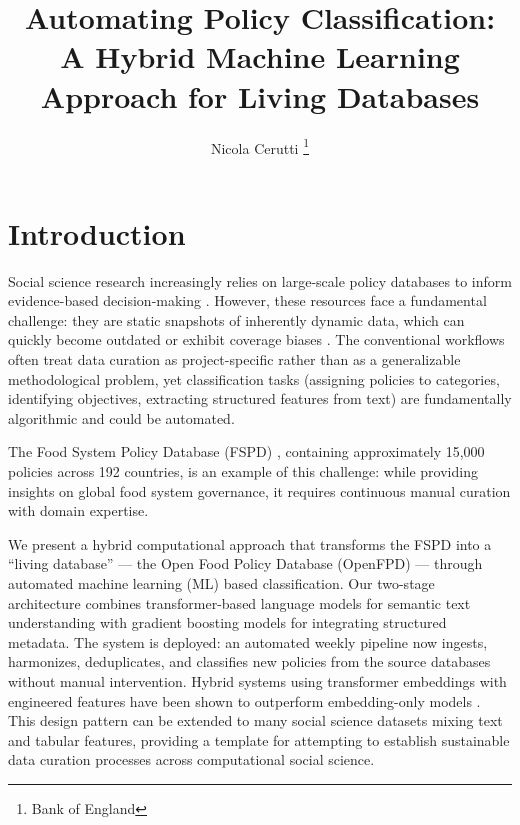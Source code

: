 \documentclass[a4paper,12pt]{article}
\title{Automating Policy Classification: A Hybrid Machine Learning Approach for Living Databases}
\date{}
\begin{document}
\maketitle
\thispagestyle{fancy}

\begin{center}
\author{Nicola Cerutti \footnote{Bank of England}}
\end{center}

\section*{Introduction}

Social science research increasingly relies on large-scale policy databases to inform evidence-based decision-making \cite{zanti2021evidence, yang2024evidence}. However, these resources face a fundamental challenge: they are static snapshots of inherently dynamic data, which can quickly become outdated or exhibit coverage biases \cite{szomszor2022overton}. The conventional workflows often treat data curation as project-specific rather than as a generalizable methodological problem, yet classification tasks (assigning policies to categories, identifying objectives, extracting structured features from text) are fundamentally algorithmic and could be automated.

The Food System Policy Database (FSPD) \cite{lowder2025}, containing approximately 15,000 policies across 192 countries, is an example of this challenge: while providing insights on global food system governance, it requires continuous manual curation with domain expertise.

We present a hybrid computational approach that transforms the FSPD into a ``living database'' — the Open Food Policy Database (OpenFPD) — through automated machine learning (ML) based classification. Our two-stage architecture combines transformer-based language models for semantic text understanding with gradient boosting models for integrating structured metadata. The system is deployed: an automated weekly pipeline now ingests, harmonizes, deduplicates, and classifies new policies from the source databases without manual intervention. Hybrid systems using transformer embeddings with engineered features have been shown to outperform embedding-only models \cite{tian2023best, levy2022comparison}. This design pattern can be extended to many social science datasets mixing text and tabular features, providing a template for attempting to establish sustainable data curation processes across computational social science.
\end{document}
